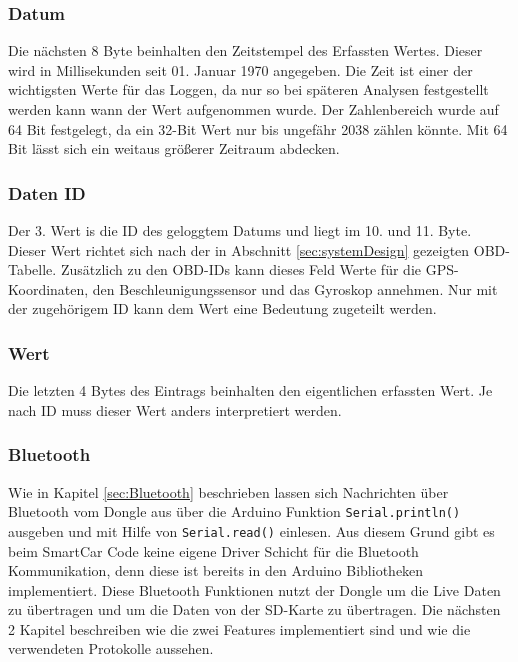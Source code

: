 \subsubsection*{Datum}
Die nächsten 8 Byte beinhalten den Zeitstempel des Erfassten Wertes. Dieser wird in Millisekunden seit 01. Januar 1970 angegeben. Die Zeit ist einer der wichtigsten Werte für das Loggen, da nur so bei späteren Analysen festgestellt werden kann wann der Wert aufgenommen wurde. Der Zahlenbereich wurde auf 64 Bit festgelegt, da ein 32-Bit Wert nur bis ungefähr 2038 zählen könnte. Mit 64 Bit lässt sich ein weitaus größerer Zeitraum abdecken.
\subsubsection*{Daten ID}
Der 3. Wert is die ID des geloggtem Datums und liegt im 10. und 11. Byte. Dieser Wert richtet sich nach der in Abschnitt \ref{sec:systemDesign} gezeigten OBD-Tabelle. Zusätzlich zu den OBD-IDs kann dieses Feld Werte für die GPS-Koordinaten, den Beschleunigungssensor und das Gyroskop annehmen.  Nur mit der zugehörigem ID kann dem Wert eine Bedeutung zugeteilt werden. 
\subsubsection*{Wert}
Die letzten 4 Bytes des Eintrags beinhalten den eigentlichen erfassten Wert. Je nach ID muss dieser Wert anders interpretiert werden.

\subsubsection{Bluetooth}
Wie in Kapitel \ref{sec:Bluetooth} beschrieben lassen sich Nachrichten über Bluetooth vom Dongle aus über die Arduino Funktion \texttt{Serial.println()} ausgeben und mit Hilfe von \texttt{Serial.read()} einlesen. Aus diesem Grund gibt es beim SmartCar Code keine eigene Driver Schicht für die Bluetooth Kommunikation, denn diese ist bereits in den Arduino Bibliotheken implementiert. Diese Bluetooth Funktionen nutzt der Dongle um die Live Daten zu übertragen und um die Daten von der SD-Karte zu übertragen. Die nächsten 2 Kapitel beschreiben wie die zwei Features implementiert sind und wie die verwendeten Protokolle aussehen.
